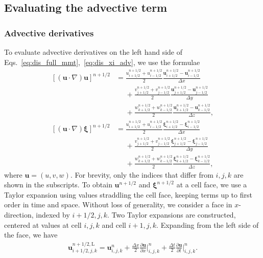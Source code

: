 \documentclass[times, 10pt]{article}
\renewcommand{\vec}[1]{\mathbf{#1}}
\newcommand{\p}{\partial}
\newcommand{\vu}{\vec{u}}
\newcommand{\vxi}{\boldsymbol\xi}
\begin{document}
\subsection{Evaluating the advective term}
\label{sub:adv}
\subsubsection*{Advective derivatives}
To evaluate advective derivatives on the left hand side of Eqs.~\eqref{eq:dis_full_mmt},~\eqref{eq:dis_xi_adv}, we use the formulae
\begin{align}
\label{eq:adv_terms}
 \left[ (\vu \cdot \nabla ) \vu \right]^{n+1/2} &= \frac{u^{n+1/2}_{i+1/2} + u^{n+1/2}_{i-1/2}}{2} \frac{\vu^{n+1/2}_{i+1/2} - \vu^{n+1/2}_{i-1/2}}{\Delta x} \nonumber \\
 &\phantom{=}+ \frac{v^{n+1/2}_{j+1/2} + v^{n+1/2}_{j-1/2}}{2} \frac{\vu^{n+1/2}_{j+1/2} - \vu^{n+1/2}_{j-1/2}}{\Delta y} \nonumber \\
 &\phantom{=}+  \frac{w^{n+1/2}_{k+1/2} + w^{n+1/2}_{k-1/2}}{2} \frac{\vu^{n+1/2}_{k+1/2} - \vu^{n+1/2}_{k-1/2}}{\Delta z}, \\
  \left[ (\vu \cdot \nabla ) \vxi \right]^{n+1/2}  &= \frac{u^{n+1/2}_{i+1/2} + u^{n+1/2}_{i-1/2}}{2} \frac{\vxi^{n+1/2}_{i+1/2} - \vxi^{n+1/2}_{i-1/2}}{\Delta x} \nonumber \\
  &\phantom{=}+ \frac{v^{n+1/2}_{j+1/2} + v^{n+1/2}_{j-1/2}}{2} \frac{\vxi^{n+1/2}_{j+1/2} - \vxi^{n+1/2}_{j-1/2}}{\Delta y} \nonumber \\
  &\phantom{=}+  \frac{w^{n+1/2}_{k+1/2} + w^{n+1/2}_{k-1/2}}{2} \frac{\vxi^{n+1/2}_{k+1/2} - \vxi^{n+1/2}_{k-1/2}}{\Delta z},
\end{align}
where $\vu=(u,v,w)$. For brevity, only the indices that differ from $i,j,k$ are shown in the subscripts. To obtain $\vu^{n+1/2}$ and $\vxi^{n+1/2}$ at a cell face, we use a Taylor expansion using values straddling the cell face, keeping terms up to first order in time and space. Without loss of generality, we consider a face in $x$-direction, indexed by ${i+1/2, j, k}$. Two Taylor expansions are constructed, centered at values at cell $i,j,k$ and cell ${i+1,j,k}$.
%
Expanding from the left side of the face, we have
\begin{align}
\vu^{n+1/2,\text{L}}_{i+1/2,j,k} = \vu^{n}_{i,j,k} + \frac{\Delta x}{2} \frac{\p \vu}{\p x} \bigg |^n_{i,j,k} + \frac{\Delta t}{2} \frac{\p \vu}{\p t} \bigg |^n_{i,j,k}.
\label{eq:taylor_left}
\end{align}
\end{document}
